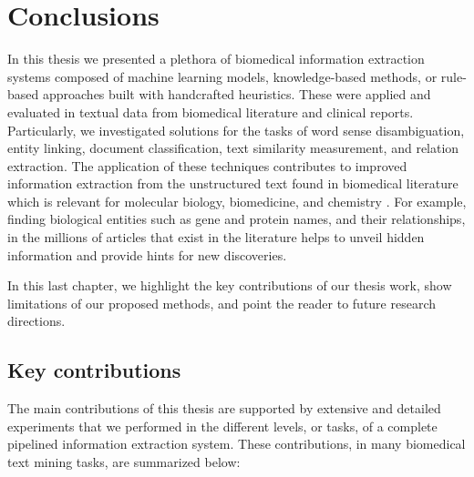 \chapter{Conclusions}
\label{c6}

In this thesis we presented a plethora of biomedical information extraction systems composed of machine learning models, knowledge-based methods, or rule-based approaches built with handcrafted heuristics.
These were applied and evaluated in textual data from biomedical literature and clinical reports.
Particularly, we investigated solutions for the  tasks of word sense disambiguation, entity linking, document classification, text similarity measurement, and relation extraction.
The application of these techniques contributes to improved information extraction from the unstructured text found in biomedical literature which is relevant for molecular biology, biomedicine, and chemistry \parencite{krallinger2005a,krallinger2017b}.
For example, finding biological entities such as gene and protein names, and their relationships, in the millions of articles that exist in the literature helps to unveil hidden information and provide hints for new discoveries.

In this last chapter, we highlight the key contributions of our thesis work, show limitations of our proposed methods, and point the reader to future research directions.


\section{Key contributions}

The main contributions of this thesis are supported by extensive and detailed experiments that we performed in the different levels, or tasks, of a complete pipelined information extraction system.
These contributions, in many biomedical text mining tasks, are summarized below:

